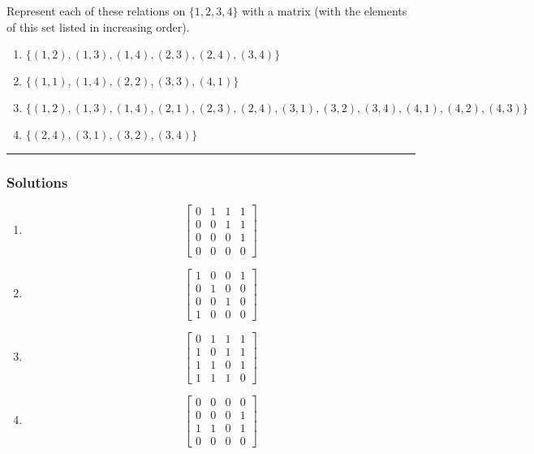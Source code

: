 \newpage
\begin{question}
Represent each of these relations on $\{1, 2, 3, 4\}$ with a
matrix (with the elements of this set listed in increasing
order).
\begin{enumerate}
    \item $\{(1, 2), (1, 3), (1, 4), (2, 3), (2, 4), (3, 4)\}$
    \item $\{(1, 1), (1, 4), (2, 2), (3, 3), (4, 1)\}$
    \item $\{(1, 2), (1, 3), (1, 4), (2, 1), (2, 3), (2, 4), (3, 1), (3, 2),
(3, 4), (4, 1), (4, 2), (4, 3)\}$
    \item $\{(2, 4), (3, 1), (3, 2), (3, 4)\}$
\end{enumerate}
\end{question}

\par\noindent\rule{\textwidth}{0.5pt}

\subsubsection*{Solutions}

\begin{enumerate}
    \item
    $$\begin{bmatrix}
        0 & 1 & 1 & 1 \\
        0 & 0 & 1 & 1 \\
        0 & 0 & 0 & 1 \\
        0 & 0 & 0 & 0
    \end{bmatrix}$$
    \item
    $$\begin{bmatrix}
        1 & 0 & 0 & 1 \\
        0 & 1 & 0 & 0 \\
        0 & 0 & 1 & 0 \\
        1 & 0 & 0 & 0 
    \end{bmatrix}$$
    \item
    $$\begin{bmatrix}
        0 & 1 & 1 & 1 \\
        1 & 0 & 1 & 1 \\
        1 & 1 & 0 & 1 \\
        1 & 1 & 1 & 0 
    \end{bmatrix}$$
    \item
    $$\begin{bmatrix}
        0 & 0 & 0 & 0 \\
        0 & 0 & 0 & 1 \\
        1 & 1 & 0 & 1 \\
        0 & 0 & 0 & 0 
    \end{bmatrix}$$
\end{enumerate}